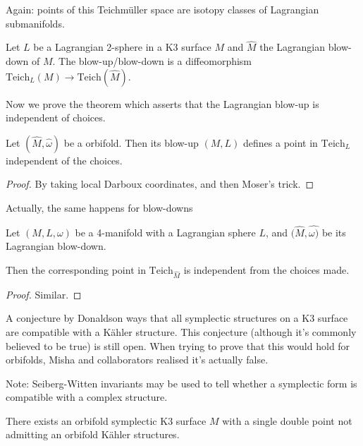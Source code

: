 \noindent
Again: points of this Teichmüller space are
isotopy classes
of Lagrangian submanifolds.

\medskip\noindent
\begin{theorem}
\label{theorem-blow-down-diffeomorphism}
Let $L$ be a Lagrangian 2-sphere in a K3
surface  $M$
and $\hat{M}$ the Lagrangian blow-down of
$M$.
The blow-up/blow-down
is a diffeomorphism $\text{Teich}_L(M) \to
\text{Teich}(\hat{M})$.
\end{theorem}

\medskip\noindent
Now we prove the theorem which asserts that
the Lagrangian
blow-up is independent of choices.

\begin{theorem}
\label{theorem-lagrangian-blow-up-well-defined}
Let $(\hat{M},\hat{\omega})$ be a orbifold.
Then its blow-up
$(M,L)$ defines a point in $\text{Teich}_L$
independent of the choices.
\end{theorem}

\begin{proof}
By taking local Darboux coordinates, and then
Moser's trick.
\end{proof}

\noindent
Actually, the same happens for blow-downs

\begin{theorem}
\label{theorem-same-for-blow-down}
Let $(M,L,\omega)$ be a 4-manifold with a
Lagrangian sphere $L$, and
$(\hat{M},\hat{\omega)}$ be its Lagrangian
blow-down.

Then the corresponding point in
$\text{Teich}_{\hat{M}}$ is
independent from the choices made.
\end{theorem}

\begin{proof}
Similar.
\end{proof}

\medskip\noindent
A conjecture by Donaldson ways that all
symplectic structures on a K3
surface are compatible with a Kähler
structure. This conjecture
(although it's commonly believed to be true)
is still open.
When trying to prove that this would hold for
orbifolds,
Misha and collaborators realised it's
actually false.

Note: Seiberg-Witten invariants may be used
to tell whether a symplectic
form is compatible with a complex structure.

\begin{theorem}
\label{theorem-conje-false-orbif}
There exists an orbifold symplectic K3
surface $M$ with a single
double point not admitting an orbifold Kähler
structures.
\end{theorem}

